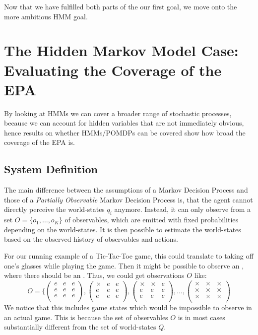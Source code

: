 \documentclass{article}
\theoremstyle{definition}
\def\ticX{\text{${\times}$}}
\def\ticO{\text{\small{\textcircled{ }}}}
\begin{document}
\bigskip
Now that we have fulfilled both parts of the our first goal, we move onto the more ambitious HMM goal.
\section{The Hidden Markov Model Case:  Evaluating the Coverage of the EPA}\label{sec:HMM}
By looking at HMMs we can cover a broader range of stochastic processes, because we can account for hidden variables that are not immediately obvious, hence results on whether HMMs/POMDPs can be covered show how broad the coverage of the EPA is.
\subsection{System Definition}
The main difference between the assumptions of a Markov Decision Process and those of a \emph{Partially Observable} Markov Decision Process is, that the agent cannot directly perceive the world-states $q_i$ anymore. Instead, it can only observe from a set $O=\{o_1,\ldots,o_K\}$ of observables, which are emitted with fixed probabilities depending on the world-states. It is then possible to estimate the world-states based on the observed history of observables and actions. 

For our running example of a Tic-Tac-Toe game, this could translate to taking off one's glasses while playing the game. Then it might be possible to observe an {\ticO}, where there should be an {\ticX}. Thus, we could get observations $O$ like:
\[
O=\{
\left ( 
\begin{matrix}
e & e & e \\
e & e & e \\
e & e & e \\ 
\end{matrix}
\right )
,
\left ( 
\begin{matrix}
{\ticX} & e & e \\
e & e & e \\
e & e & e \\ 
\end{matrix}
\right )
,
\left ( 
\begin{matrix}
{\ticX} & {\ticX} & e \\
e & e & e \\
e & e & e \\ 
\end{matrix}
\right ), \ldots,
\left ( 
\begin{matrix}
{\ticX} & {\ticX} & {\ticX} \\
{\ticX} & {\ticX} & {\ticX} \\
{\ticX} & {\ticX} & {\ticX} \\ 
\end{matrix}
\right )
\]
We notice that this includes game states which would be impossible to observe in an actual game. This is because the set of observables $O$ is in most cases substantially different from the set of world-states $Q$. 
\end{document}
